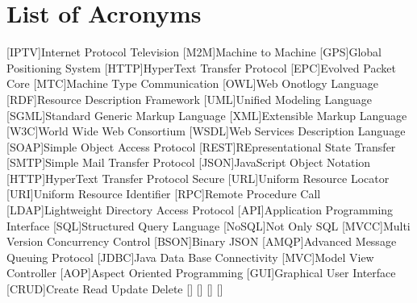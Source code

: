 \pagebreak
\section*{List of Acronyms}
\begin{acronym}
        [IPTV]{Internet Protocol Television}
        [M2M]{Machine to Machine}
        [GPS]{Global Positioning System}
        [HTTP]{HyperText Transfer Protocol}
        [EPC]{Evolved Packet Core}
        [MTC]{Machine Type Communication}
		[OWL]{Web Onotlogy Language}
		[RDF]{Resource Description Framework}
		[UML]{Unified Modeling Language}
		{Standard Generic Markup Language}
		[XML]{Extensible Markup Language}
		[W3C]{World Wide Web Consortium}
		{Web Services Description Language}
		{Simple Object Access Protocol}
		{REpresentational State Transfer}
		{Simple Mail Transfer Protocol}
		{JavaScript Object Notation}
		{HyperText Transfer Protocol Secure}
		[URL]{Uniform Resource Locator}
		[URI]{Uniform Resource Identifier}
		[RPC]{Remote Procedure Call}
		{Lightweight Directory Access Protocol}
		[API]{Application Programming Interface}
		[SQL]{Structured Query Language}
		[NoSQL]{Not Only SQL}
		{Multi Version Concurrency Control}
		{Binary JSON}
		{Advanced Message Queuing Protocol}
		{Java Data Base Connectivity}
		[MVC]{Model View Controller}
		[AOP]{Aspect Oriented Programming}
		[GUI]{Graphical User Interface}
		{Create Read Update Delete}
		\acro{}[]{}
		\acro{}[]{}
		\acro{}[]{}
		\acro{}[]{}
		
\end{acronym}
